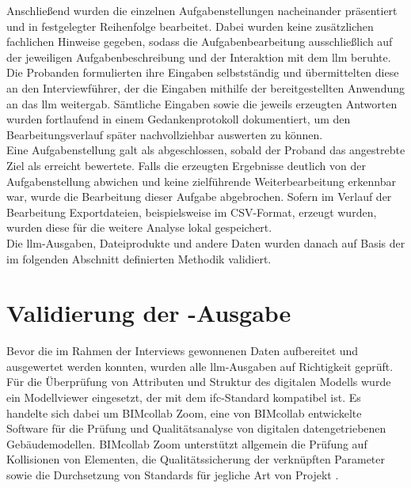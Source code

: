 Anschließend wurden die einzelnen Aufgabenstellungen nacheinander präsentiert und in festgelegter Reihenfolge bearbeitet. 
Dabei wurden keine zusätzlichen fachlichen Hinweise gegeben, sodass die Aufgabenbearbeitung ausschließlich auf der jeweiligen Aufgabenbeschreibung und der Interaktion mit dem \gls{llm} beruhte. \\

Die Probanden formulierten ihre Eingaben selbstständig und übermittelten diese an den Interviewführer, der die Eingaben mithilfe der bereitgestellten Anwendung an das \gls{llm} weitergab. 
Sämtliche Eingaben sowie die jeweils erzeugten Antworten wurden fortlaufend in einem Gedankenprotokoll dokumentiert, um den Bearbeitungsverlauf später nachvollziehbar auswerten zu können. \\

Eine Aufgabenstellung galt als abgeschlossen, sobald der Proband das angestrebte Ziel als erreicht bewertete. 
Falls die erzeugten Ergebnisse deutlich von der Aufgabenstellung abwichen und keine zielführende Weiterbearbeitung erkennbar war, wurde die Bearbeitung dieser Aufgabe abgebrochen. 
Sofern im Verlauf der Bearbeitung Exportdateien, beispielsweise im CSV-Format, erzeugt wurden, wurden diese für die weitere Analyse lokal gespeichert. \\

Die \gls{llm}-Ausgaben, Dateiprodukte und andere Daten wurden danach auf Basis der im folgenden Abschnitt definierten Methodik validiert.

\section{Validierung der -Ausgabe}
\label{sec:datenvalidierung}

Bevor die im Rahmen der Interviews gewonnenen Daten aufbereitet und ausgewertet werden konnten, wurden alle \gls{llm}-Ausgaben auf Richtigkeit geprüft. \\

Für die Überprüfung von Attributen und Struktur des digitalen Modells wurde ein Modellviewer eingesetzt, der mit dem \gls{ifc}-Standard kompatibel ist.
Es handelte sich dabei um BIMcollab Zoom, eine von BIMcollab entwickelte Software für die Prüfung und Qualitätsanalyse von digitalen datengetriebenen Gebäudemodellen.
BIMcollab Zoom unterstützt allgemein die Prüfung auf Kollisionen von Elementen, die Qualitätssicherung der verknüpften Parameter sowie die Durchsetzung von Standards für jegliche Art von Projekt \cite{bimcollabUnknownZoom}. \\

